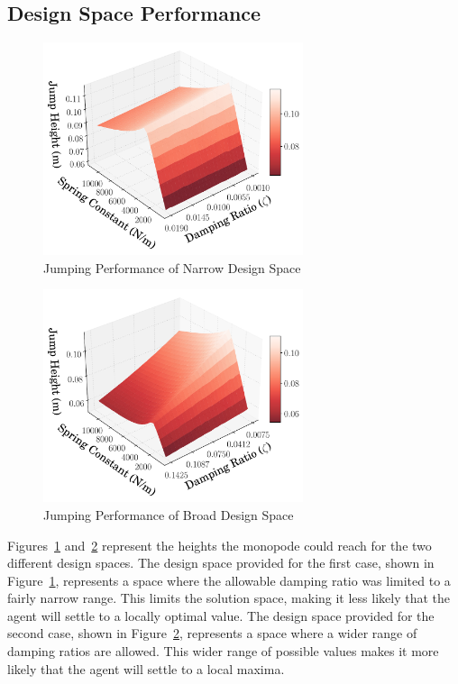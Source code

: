 \documentclass[10pt,twocolumn,letterpaper]{article}
\begin{document}
\subsection{Design Space Performance}
%
\begin{figure}[!t]
        \begin{center}
        \includegraphics[width = 3in]{figures/design_space_narr/Design_3D_Plot_0.01_.pdf}  
        \caption{Jumping Performance of Narrow Design Space}
        \label{fig:spring_zeta_height_close}
        \end{center}
\end{figure}
%
\begin{figure}[!t]
        \begin{center}
        \includegraphics[width = 3in]{figures/design_space_wide/Design_3D_Plot_0.075_.pdf}  
        \caption{Jumping Performance of Broad Design Space}
        \label{fig:spring_zeta_height_far}
        \end{center}
\end{figure}
%

Figures~\ref{fig:spring_zeta_height_close} and~\ref{fig:spring_zeta_height_far} represent the heights the monopode could reach for the two different design spaces. The design space provided for the first case, shown in Figure~\ref{fig:spring_zeta_height_close}, represents a space where the allowable damping ratio was limited to a fairly narrow range. This limits the solution space, making it less likely that the agent will settle to a locally optimal value. The design space provided for the second case, shown in Figure~\ref{fig:spring_zeta_height_far}, represents a space where a wider range of damping ratios are allowed. This wider range of possible values makes it more likely that the agent will settle to a local maxima.
\end{document}
